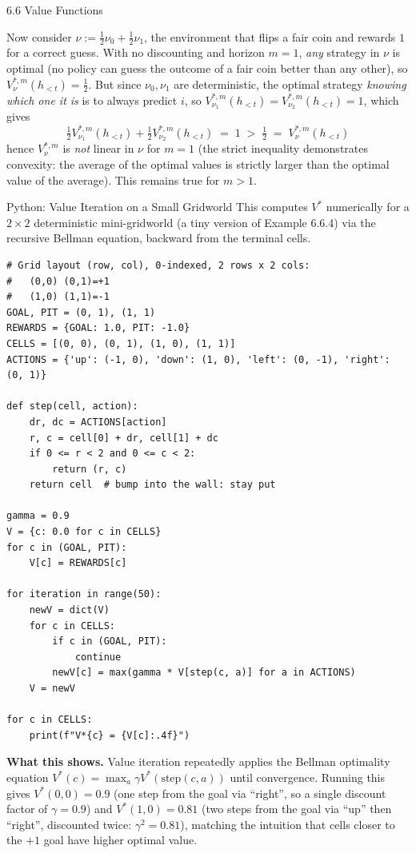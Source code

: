 \documentclass[aspectratio=169,10pt]{beamer}
\begin{document}
\begin{frame}[allowframebreaks]{6.6 Value Functions}
\framebreak

Now consider $\nu := \tfrac12\nu_0 + \tfrac12\nu_1$, the environment that
flips a fair coin and rewards $1$ for a correct guess. With no discounting
and horizon $m=1$, \emph{any} strategy in $\nu$ is optimal (no policy can
guess the outcome of a fair coin better than any other), so
$V^{*,m}_\nu(h_{<t}) = \tfrac12$. But since $\nu_0,\nu_1$ are deterministic,
the optimal strategy \emph{knowing which one it is} is to always predict
$i$, so $V^{*,m}_{\nu_1}(h_{<t}) = V^{*,m}_{\nu_2}(h_{<t}) = 1$, which gives
\[
  \tfrac12 V^{*,m}_{\nu_1}(h_{<t}) + \tfrac12 V^{*,m}_{\nu_2}(h_{<t})
  \;=\; 1 \;>\; \tfrac12 \;=\; V^{*,m}_\nu(h_{<t})
\]
hence $V^{*,m}_\nu$ is \emph{not} linear in $\nu$ for $m=1$ (the strict
inequality demonstrates convexity: the average of the optimal values is
strictly larger than the optimal value of the average). This remains true
for $m>1$.
\end{frame}

\begin{frame}[fragile]{Python: Value Iteration on a Small Gridworld}
This computes $V^{*}$ numerically for a $2\times 2$ deterministic
mini-gridworld (a tiny version of Example 6.6.4) via the recursive Bellman
equation, backward from the terminal cells.

\begin{lstlisting}
# Grid layout (row, col), 0-indexed, 2 rows x 2 cols:
#   (0,0) (0,1)=+1
#   (1,0) (1,1)=-1
GOAL, PIT = (0, 1), (1, 1)
REWARDS = {GOAL: 1.0, PIT: -1.0}
CELLS = [(0, 0), (0, 1), (1, 0), (1, 1)]
ACTIONS = {'up': (-1, 0), 'down': (1, 0), 'left': (0, -1), 'right': (0, 1)}

def step(cell, action):
    dr, dc = ACTIONS[action]
    r, c = cell[0] + dr, cell[1] + dc
    if 0 <= r < 2 and 0 <= c < 2:
        return (r, c)
    return cell  # bump into the wall: stay put

gamma = 0.9
V = {c: 0.0 for c in CELLS}
for c in (GOAL, PIT):
    V[c] = REWARDS[c]

for iteration in range(50):
    newV = dict(V)
    for c in CELLS:
        if c in (GOAL, PIT):
            continue
        newV[c] = max(gamma * V[step(c, a)] for a in ACTIONS)
    V = newV

for c in CELLS:
    print(f"V*{c} = {V[c]:.4f}")
\end{lstlisting}

\textbf{What this shows.} Value iteration repeatedly applies the Bellman
optimality equation $V^{*}(c) = \max_a \gamma V^{*}(\text{step}(c,a))$ until
convergence. Running this gives $V^{*}(0,0) = 0.9$ (one step from the goal
via ``right'', so a single discount factor of $\gamma=0.9$) and
$V^{*}(1,0)=0.81$ (two steps from the goal via ``up'' then ``right'',
discounted twice: $\gamma^2=0.81$), matching the intuition that cells
closer to the $+1$ goal have higher optimal value.
\end{frame}
\end{document}
